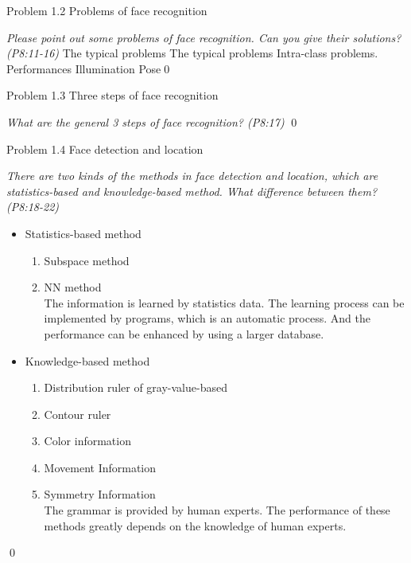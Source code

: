 \documentclass[
        ]{beamer}
\begin{document}
\begin{frame}[t]{Problem 1.2 Problems of face recognition}    		
	\begin{overprint}
	\emph{Please point out some problems of face recognition. Can you give their solutions? (P8:11-16)}
	\onslide<2> 
	The typical problems
	\onslide<3> 
	The typical problems
	\onslide<4> 
	Intra-class problems.
	\onslide<5> 
	Performances
	\onslide<6> 
	Illumination
	\onslide<7> 
	Pose\qed		
	\end{overprint}
\end{frame}

\begin{frame}[t]{Problem 1.3 Three steps of face recognition}    		
	\begin{overprint}
	\onslide<1>
	\emph{What are the general 3 steps of face recognition? (P8:17)}
	\onslide<2>  \qed		
	\end{overprint}
\end{frame}

\begin{frame}[t]{Problem 1.4 Face detection and location}    		
	\begin{overprint}
	\emph{There are two kinds of the methods in face detection and location, which are statistics-based and knowledge-based method. What difference between them? (P8:18-22)}
	\onslide<2> \inpdfc{8}{18}
	\onslide<3> \inpdfc{8}{19}
	\onslide<4> \inpdfc{8}{20}
	\onslide<5> \inpdfc{8}{21}
	\onslide<6> \inpdfc{8}{22}
		\begin{itemize}
			\item Statistics-based method
			\begin{enumerate}
				\item Subspace method
				\item NN method\\
				\alert{The information is learned by statistics data. The learning process can be implemented by programs, which is an automatic process. And the performance can be enhanced by using a larger database.}
				\end{enumerate}
				\item Knowledge-based method
			\begin{enumerate}
					\item Distribution ruler of gray-value-based
					\item Contour ruler
					\item Color information
					\item Movement Information
					\item Symmetry Information	\\
				\alert{The grammar is provided by human experts. The performance of these methods greatly depends on the knowledge of human experts.}
				\end{enumerate}
		\end{itemize}		
	\qed		
	\end{overprint}
\end{frame}
\end{document}
